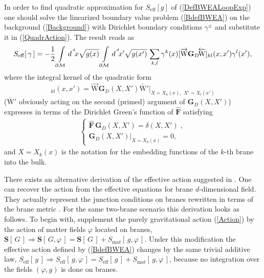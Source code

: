 \documentclass[a4paper,12pt]{article}
\newcommand{\ddim}{{d}}
\newcommand{\dM}{{\partial \cal M}}
\newcommand{\dx}{d^{^{\,\ddim}} \!x}
\newcommand{\BBox}{\hat{\mathbf{F}}}  %
\newcommand{\GrD}{\mathbf{G}_{D}}
\newcommand{\WGrDW}{\overrightarrow{\mathrm{W}}\mathbf{G}_{D}\!\overleftarrow{\mathrm{W}}}
\newcommand{\htt}{\gamma}   %
\begin{document}
In order to find quadratic approximation for $S_{\mathrm{eff}}[g]$
of (\ref{DefBWEALoopExp}) one should solve the linearized boundary
value problem (\ref{BdefBWEA}) on the background
(\ref{Background}) with Dirichlet boundary conditions $\htt^\pm$
and substitute it in (\ref{QuadrAction}). The result reads as
\cite{Duality}
    \begin{equation}
     S_{\mathrm{eff}}[\,\htt\,]=
     -\frac12 \int
     \limits_{\dM}\dx\sqrt{g(x)}
     \int\limits_{\dM}\dx'\sqrt{g(x')}\,
     \sum_{k,l}\htt^k(x)[\WGrDW]_{kl}(x,x')
     \htt^l(x'),                            \label{DEffAction}
    \end{equation}
where the integral kernel of the quadratic form
    \begin{equation}
     [\WGrDW]_{kl}
     (x,x')=
    \overrightarrow{\mathrm{W}}\GrD(X,X')
    \overleftarrow{\mathrm{W}'}
     \Big|_{X=X_k(x),\,\,X'=X_l(x')}          \label{WGW}
    \end{equation}
($\overleftarrow{\mathrm{W}'}$ obviously acting on the second
(primed) argument of $\GrD(X,X')$) expresses in terms of the
Dirichlet Green's function of $\BBox$ satisfying
    \begin{eqnarray}
     \left\{ \begin{array}{l}
     \BBox \,\GrD(X,X')=\delta(X,X')\;, \\
     \GrD(X,X')\big|_{X=X_k(x)}\!\!=0,
     \end{array} \right.                     \label{DGfbvp}
    \end{eqnarray}
and $X=X_k(x)$ is the notation for the embedding functions of the
$k$-th brane into the bulk.

There exists an alternative derivation of the effective action
suggested in \cite{BWEA,brane}. One can recover the action from
the effective equations for brane $\ddim$-dimensional field. They
actually represent the junction conditions on branes rewritten in
terms of the brane metric \cite{BWEA,Duality}. For the same
two-brane scenario this derivation looks as follows. To begin
with, supplement the purely gravitational action (\ref{Action}) by
the action of matter fields $\varphi$ located on branes, $
\mathbf{S}[\,G\,]\Rightarrow \mathbf{S}[\,G,\varphi\,]=
\mathbf{S}[\,G\,] +S_{\mathrm mat}[\,g,\varphi\,]$. Under this
modification the effective action defined by (\ref{BdefBWEA})
changes by the same trivial additive law,
$S_{\mathrm{eff}}[\,g\,]\Rightarrow
S_{\mathrm{eff}}[\,g,\varphi\,]=S_{\mathrm{eff}}[\,g\,]
+S_{\mathrm mat}[\,g,\varphi\,]$, because no integration over the
fields $(\varphi,g)$ is done on branes.
\end{document}
